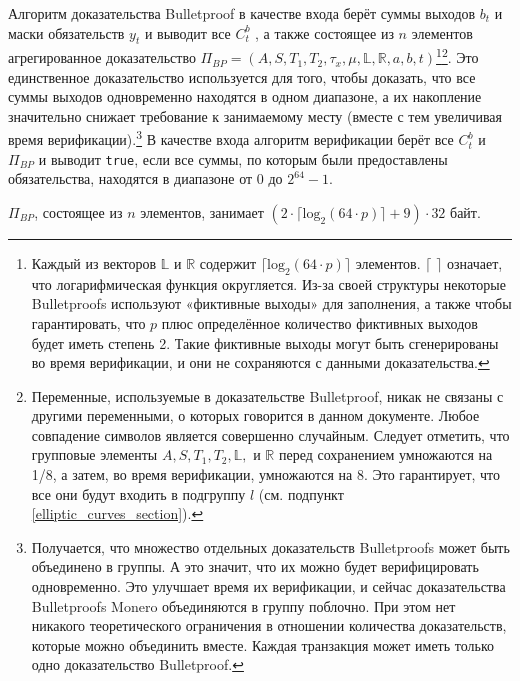 Алгоритм доказательства Bulletproof в качестве входа берёт суммы выходов $b_t$ и маски обяза\-тельств $y_t$ и выводит все $C^b_t$ , а также состоящее из $n$ элементов агрегированное доказательство $\Pi_{BP} = (A, S, T_1, T_2, \tau_x, \mu, \mathbb{L}, \mathbb{R}, a, b, t)$\footnote{Каждый из векторов $\mathbb{L}$ и $\mathbb{R}$ содержит $\lceil \textrm{log}_2(64 \cdot p) \rceil$ элементов. $\lceil$ $\rceil$ означает, что логарифмическая функция округляется. Из-за своей структуры некоторые Bulletproofs используют «фиктивные выходы» для заполнения, а также чтобы гарантировать, что $p$ плюс определённое количество фиктивных выходов будет иметь степень 2. Такие фиктивные выходы могут быть сгенерированы во время верификации, и они не сохраняются с данными доказательства.}\footnote{Переменные, используемые в доказательстве Bulletproof, никак не связаны с другими переменными, о которых говорится в данном документе. Любое совпадение символов является совершенно случайным. Следует отметить, что групповые элементы $A, S, T_1, T_2, \mathbb{L},$ и $\mathbb{R}$ перед сохранением умножаются на 1/8, а затем, во время верификации, умножаются на 8. Это гарантирует, что все они будут входить в подгруппу $l$ (см. подпункт \ref{elliptic_curves_section}).}. Это единственное доказательство используется для того, чтобы доказать, что все суммы выходов одновременно находятся в одном диапазоне, а их накопление значительно снижает требование к занимаемому месту (вместе с тем увеличивая время верификации).\footnote{Получается, что множество отдельных доказательств Bulletproofs может быть объединено в группы. А это значит, что их можно будет верифицировать одновременно. Это улучшает время их верификации, и сейчас доказательства Bulletproofs Monero объединяются в группу поблочно. При этом нет никакого теоретического ограничения в отношении количества доказательств, которые можно объединить вместе. Каждая транзакция может иметь только одно доказательство Bulletproof.} В качестве входа алгоритм верификации берёт все $C^b_t$ и $\Pi_{BP}$ и выводит {\tt true}, если все суммы, по которым были предоставлены обязательства, находятся в диапазоне от 0 до $2^{64} - 1$.

$\Pi_{BP}$, состоящее из $n$ элементов, занимает $(2 \cdot \lceil \textrm{log}_2(64 \cdot p) \rceil + 9) \cdot 32$ байт.